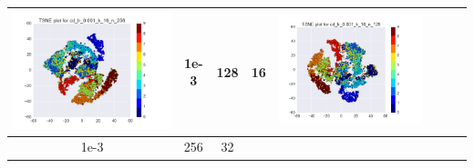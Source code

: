 \documentclass[12pt]{report}
\begin{document}
\begin{table}[H]
\begin{tabular}{ | c | c | c | c || c | c | c| c |}
\begin{minipage}{.3\textwidth}
      \includegraphics[scale=0.25]{cd_lr_0_001_k_16_n_256.png}
    \end{minipage}
     & 1e-3 & 128 & 16 &
    \begin{minipage}{.3\textwidth}
      \includegraphics[scale=0.25]{cd_lr_0_001_k_16_n_128.png}
    \end{minipage}
    \\ \hline
        1e-3 & 256 & 32 &
    \begin{minipage}{.3\textwidth}

\end{minipage}
\end{tabular}
\end{table}
\end{document}
